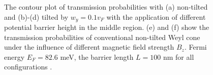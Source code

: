 \begin{figure}[H]
\begin{subfigure}[b]{0.4\linewidth}
            \caption{}
            \label{2fig:anomalous6}
        \end{subfigure}
    \caption{The contour plot of transmission probabilities with (a) non-tilted and (b)-(d) tilted by $w_y = 0.1v_F$
                with the application of different potential barrier height in the middle region. 
                (e) and (f) show the transmission probabilities of conventional non-tilted Weyl cone
                under the influence of different magnetic field strength $B_z$. Fermi energy $E_F = 82.6$ meV, the barrier length
                $L = 100$ nm for all configurations \cite{Yesilyurt2017a}.}
    \label{2fig:anomalous}
    \end{figure}